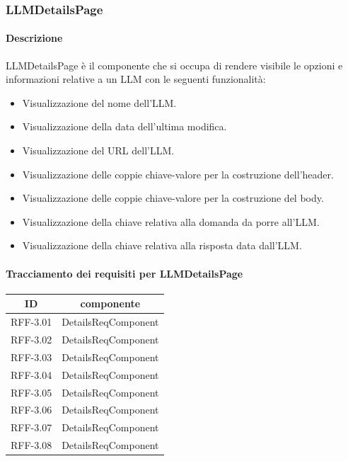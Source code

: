 \subsubsection{LLMDetailsPage} 
\label{sec:LLMDetailsPage}
\paragraph{Descrizione}
LLMDetailsPage è il componente che si occupa di rendere visibile le opzioni e informazioni relative a un LLM con le seguenti funzionalità:
\begin{itemize}
    \item Visualizzazione del nome dell'LLM.
    \item Visualizzazione della data dell'ultima modifica.
    \item Visualizzazione del URL dell'LLM.
    \item Visualizzazione delle coppie chiave-valore per la costruzione dell'header.
    \item Visualizzazione delle coppie chiave-valore per la costruzione del body.
    \item Visualizzazione della chiave relativa alla domanda da porre all'LLM.
    \item Visualizzazione della chiave relativa alla risposta data dall'LLM.
\end{itemize} 

\paragraph{Tracciamento dei requisiti per LLMDetailsPage}
\begin{tabularx}{\textwidth}{|c|c|}
    \hline
    \textbf{ID} & \textbf{componente} \\
    \hline
        RFF-3.01 & DetailsReqComponent \\
    \hline
        RFF-3.02 & DetailsReqComponent \\
    \hline
        RFF-3.03 & DetailsReqComponent \\
    \hline
        RFF-3.04 & DetailsReqComponent \\
    \hline
        RFF-3.05 & DetailsReqComponent \\
    \hline
        RFF-3.06 & DetailsReqComponent \\
    \hline
        RFF-3.07 & DetailsReqComponent \\
    \hline
        RFF-3.08 & DetailsReqComponent \\
    \hline
\end{tabularx}